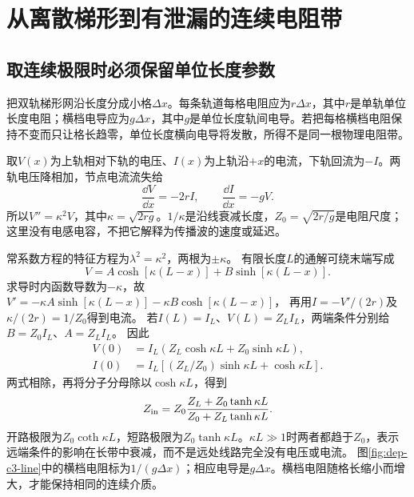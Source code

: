 \section{从离散梯形到有泄漏的连续电阻带}
\subsection{取连续极限时必须保留单位长度参数}
把双轨梯形网沿长度分成小格$\Delta x$。每条轨道每格电阻应为$r\Delta x$，其中$r$是单轨单位长度电阻；横档电导应为$g\Delta x$，其中$g$是单位长度轨间电导。若把每格横档电阻保持不变而只让格长趋零，单位长度横向电导将发散，所得不是同一根物理电阻带。

取$V(x)$为上轨相对下轨的电压、$I(x)$为上轨沿$+x$的电流，下轨回流为$-I$。两轨电压降相加，节点电流流失给
\[
 \frac{\dd V}{\dd x}=-2rI,\qquad
 \frac{\dd I}{\dd x}=-gV.
\]
所以$V''=\kappa^2V$，其中$\kappa=\sqrt{2rg}$。$1/\kappa$是沿线衰减长度，$Z_0=\sqrt{2r/g}$是电阻尺度；这里没有电感电容，不把它解释为传播波的速度或延迟。

常系数方程的特征方程为$\lambda^2=\kappa^2$，两根为$\pm\kappa$。
有限长度$L$的通解可绕末端写成
\[
 V=A\cosh[\kappa(L-x)]+B\sinh[\kappa(L-x)].
\]
求导时内函数导数为$-\kappa$，故
$V'=-\kappa A\sinh[\kappa(L-x)]-\kappa B\cosh[\kappa(L-x)]$，
再用$I=-V'/(2r)$及$\kappa/(2r)=1/Z_0$得到电流。
若$I(L)=I_L$、$V(L)=Z_LI_L$，两端条件分别给$B=Z_0I_L$、$A=Z_LI_L$。
因此
\[
 \begin{aligned}
 V(0)&=I_L(Z_L\cosh\kappa L+Z_0\sinh\kappa L),\\
 I(0)&=I_L[(Z_L/Z_0)\sinh\kappa L+\cosh\kappa L].
 \end{aligned}
\]
两式相除，再将分子分母除以$\cosh\kappa L$，得到
\[
 Z_{\rm in}=Z_0\frac{Z_L+Z_0\tanh\kappa L}
 {Z_0+Z_L\tanh\kappa L}.
\]
开路极限为$Z_0\coth\kappa L$，短路极限为$Z_0\tanh\kappa L$。$\kappa L\gg1$时两者都趋于$Z_0$，表示远端条件的影响在长带中衰减，而不是远处线路完全没有电压或电流。
图\ref{fig:dep-c3-line}中的横档电阻标为$1/(g\Delta x)$；相应电导是$g\Delta x$。横档电阻随格长缩小而增大，才能保持相同的连续介质。

